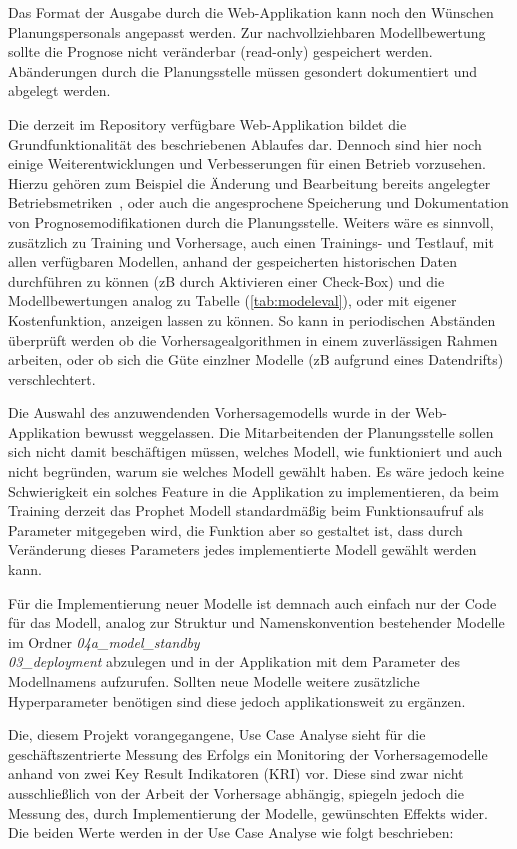 Das Format der Ausgabe durch die Web-Applikation kann noch den Wünschen Planungspersonals angepasst werden. Zur nachvollziehbaren Modellbewertung sollte die Prognose nicht veränderbar (read-only) gespeichert werden. Abänderungen durch die Planungsstelle müssen gesondert dokumentiert und abgelegt werden.

Die derzeit im Repository verfügbare Web-Applikation bildet die Grundfunktionalität des beschriebenen Ablaufes dar. Dennoch sind hier noch einige Weiterentwicklungen und Verbesserungen für einen Betrieb vorzusehen. Hierzu gehören zum Beispiel die Änderung und Bearbeitung bereits angelegter \glqq Betriebsmetriken\grqq\ , oder auch die angesprochene Speicherung und Dokumentation von Prognosemodifikationen durch die Planungsstelle. Weiters wäre es sinnvoll, zusätzlich zu Training und Vorhersage, auch einen Trainings- und Testlauf, mit allen verfügbaren Modellen, anhand der gespeicherten historischen Daten durchführen zu können (zB durch Aktivieren einer Check-Box) und die Modellbewertungen analog zu Tabelle (\ref{tab:modeleval}), oder mit eigener Kostenfunktion, anzeigen lassen zu können. So kann in periodischen Abständen überprüft werden ob die Vorhersagealgorithmen in einem zuverlässigen Rahmen arbeiten, oder ob sich die Güte einzlner Modelle (zB aufgrund eines Datendrifts) verschlechtert.

Die Auswahl des anzuwendenden Vorhersagemodells wurde in der Web-Applikation bewusst weggelassen. Die Mitarbeitenden der Planungsstelle sollen sich nicht damit beschäftigen müssen, welches Modell, wie funktioniert und auch nicht begründen, warum sie welches Modell gewählt haben. Es wäre jedoch keine Schwierigkeit ein solches Feature in die Applikation zu implementieren, da beim Training derzeit das Prophet Modell standardmäßig beim Funktionsaufruf als Parameter mitgegeben wird, die Funktion aber so gestaltet ist, dass durch Veränderung dieses Parameters jedes implementierte Modell gewählt werden kann. 

Für die Implementierung neuer Modelle ist demnach auch einfach nur der Code für das Modell, analog zur Struktur und Namenskonvention bestehender Modelle im Ordner \textit{04a\_model\_standby\\03\_deployment} abzulegen und in der Applikation mit dem Parameter des Modellnamens aufzurufen. Sollten neue Modelle weitere zusätzliche Hyperparameter benötigen sind diese jedoch applikationsweit zu ergänzen.

Die, diesem Projekt vorangegangene, Use Case Analyse sieht für die geschäftszentrierte Messung des Erfolgs ein Monitoring der Vorhersagemodelle anhand von zwei Key Result Indikatoren (KRI) vor. Diese sind zwar nicht ausschließlich von der Arbeit der Vorhersage abhängig, spiegeln jedoch die Messung des, durch Implementierung der Modelle, gewünschten Effekts wider. Die beiden Werte werden in der Use Case Analyse \citep{grunsky_rettungsdienst_2024} wie folgt beschrieben:

